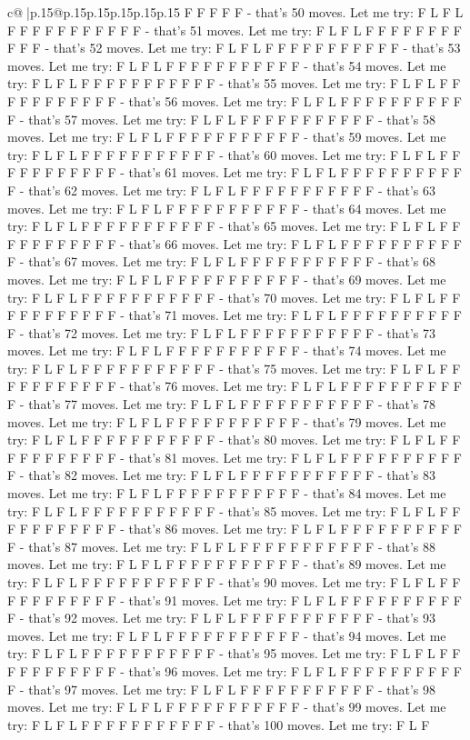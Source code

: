 \documentclass{article}
\begin{document}
{\begin{supertabular}{c@{$\;$}|p{.15\linewidth}@{}p{.15\linewidth}p{.15\linewidth}p{.15\linewidth}p{.15\linewidth}p{.15\linewidth}}
{{{F F F F F {-} that's 50 moves. Let me try: F L F L F F F F F F F F F F F {-} that's 51 moves. Let me try: F L F L F F F F F F F F F F F {-} that's 52 moves. Let me try: F L F L F F F F F F F F F F F {-} that's 53 moves. Let me try: F L F L F F F F F F F F F F F {-} that's 54 moves. Let me try: F L F L F F F F F F F F F F F {-} that's 55 moves. Let me try: F L F L F F F F F F F F F F F {-} that's 56 moves. Let me try: F L F L F F F F F F F F F F F {-} that's 57 moves. Let me try: F L F L F F F F F F F F F F F {-} that's 58 moves. Let me try: F L F L F F F F F F F F F F F {-} that's 59 moves. Let me try: F L F L F F F F F F F F F F F {-} that's 60 moves. Let me try: F L F L F F F F F F F F F F F {-} that's 61 moves. Let me try: F L F L F F F F F F F F F F F {-} that's 62 moves. Let me try: F L F L F F F F F F F F F F F {-} that's 63 moves. Let me try: F L F L F F F F F F F F F F F {-} that's 64 moves. Let me try: F L F L F F F F F F F F F F F {-} that's 65 moves. Let me try: F L F L F F F F F F F F F F F {-} that's 66 moves. Let me try: F L F L F F F F F F F F F F F {-} that's 67 moves. Let me try: F L F L F F F F F F F F F F F {-} that's 68 moves. Let me try: F L F L F F F F F F F F F F F {-} that's 69 moves. Let me try: F L F L F F F F F F F F F F F {-} that's 70 moves. Let me try: F L F L F F F F F F F F F F F {-} that's 71 moves. Let me try: F L F L F F F F F F F F F F F {-} that's 72 moves. Let me try: F L F L F F F F F F F F F F F {-} that's 73 moves. Let me try: F L F L F F F F F F F F F F F {-} that's 74 moves. Let me try: F L F L F F F F F F F F F F F {-} that's 75 moves. Let me try: F L F L F F F F F F F F F F F {-} that's 76 moves. Let me try: F L F L F F F F F F F F F F F {-} that's 77 moves. Let me try: F L F L F F F F F F F F F F F {-} that's 78 moves. Let me try: F L F L F F F F F F F F F F F {-} that's 79 moves. Let me try: F L F L F F F F F F F F F F F {-} that's 80 moves. Let me try: F L F L F F F F F F F F F F F {-} that's 81 moves. Let me try: F L F L F F F F F F F F F F F {-} that's 82 moves. Let me try: F L F L F F F F F F F F F F F {-} that's 83 moves. Let me try: F L F L F F F F F F F F F F F {-} that's 84 moves. Let me try: F L F L F F F F F F F F F F F {-} that's 85 moves. Let me try: F L F L F F F F F F F F F F F {-} that's 86 moves. Let me try: F L F L F F F F F F F F F F F {-} that's 87 moves. Let me try: F L F L F F F F F F F F F F F {-} that's 88 moves. Let me try: F L F L F F F F F F F F F F F {-} that's 89 moves. Let me try: F L F L F F F F F F F F F F F {-} that's 90 moves. Let me try: F L F L F F F F F F F F F F F {-} that's 91 moves. Let me try: F L F L F F F F F F F F F F F {-} that's 92 moves. Let me try: F L F L F F F F F F F F F F F {-} that's 93 moves. Let me try: F L F L F F F F F F F F F F F {-} that's 94 moves. Let me try: F L F L F F F F F F F F F F F {-} that's 95 moves. Let me try: F L F L F F F F F F F F F F F {-} that's 96 moves. Let me try: F L F L F F F F F F F F F F F {-} that's 97 moves. Let me try: F L F L F F F F F F F F F F F {-} that's 98 moves. Let me try: F L F L F F F F F F F F F F F {-} that's 99 moves. Let me try: F L F L F F F F F F F F F F F {-} that's 100 moves. Let me try: F L F }}}
\end{supertabular}}
\end{document}
